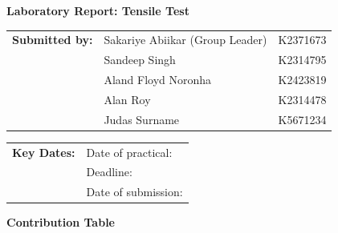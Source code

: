 \documentclass{article}
\begin{document}
       
    \large
    \vspace*{\fill}
    \begin{center}
        \textbf{\Huge Laboratory Report: Tensile Test}
    \end{center}
    \vspace*{\fill}
    
    \begin{tabular}{@{}l l l@{}}
        \textbf{Submitted by:} & Sakariye Abiikar (Group Leader) & K2371673 \\
        & Sandeep Singh                  & K2314795 \\
        & Aland Floyd Noronha            & K2423819 \\
        & Alan Roy                       & K2314478 \\
        & Judas Surname                  & K5671234 \\
    \end{tabular}
    
    \vspace*{\fill}
    
    \begin{tabular}{@{}l l@{}}
        \textbf{Key Dates:} & Date of practical: \\
        & Deadline: \\
        & Date of submission: \\
    \end{tabular}
    \vspace*{\fill}

    \newpage\noindent\vspace{2em}
    \begin{center}
        \LARGE \textbf{Contribution Table}\\[3em]
    \end{center}
    
\end{document}

